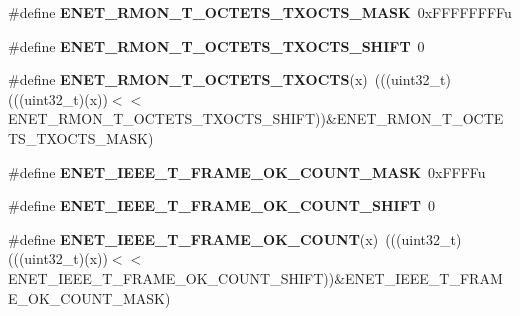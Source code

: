 \begin{DoxyCompactItemize}
\item 
\#define {\bfseries E\+N\+E\+T\+\_\+\+R\+M\+O\+N\+\_\+\+T\+\_\+\+O\+C\+T\+E\+T\+S\+\_\+\+T\+X\+O\+C\+T\+S\+\_\+\+M\+A\+SK}~0x\+F\+F\+F\+F\+F\+F\+F\+Fu\hypertarget{group__ENET__Register__Masks_ga5ad525f27fd78ec68eefefbff4b87b3a}{}\label{group__ENET__Register__Masks_ga5ad525f27fd78ec68eefefbff4b87b3a}

\item 
\#define {\bfseries E\+N\+E\+T\+\_\+\+R\+M\+O\+N\+\_\+\+T\+\_\+\+O\+C\+T\+E\+T\+S\+\_\+\+T\+X\+O\+C\+T\+S\+\_\+\+S\+H\+I\+FT}~0\hypertarget{group__ENET__Register__Masks_gacd37d2d1ea131990ecfbae1a3c933f92}{}\label{group__ENET__Register__Masks_gacd37d2d1ea131990ecfbae1a3c933f92}

\item 
\#define {\bfseries E\+N\+E\+T\+\_\+\+R\+M\+O\+N\+\_\+\+T\+\_\+\+O\+C\+T\+E\+T\+S\+\_\+\+T\+X\+O\+C\+TS}(x)~(((uint32\+\_\+t)(((uint32\+\_\+t)(x))$<$$<$E\+N\+E\+T\+\_\+\+R\+M\+O\+N\+\_\+\+T\+\_\+\+O\+C\+T\+E\+T\+S\+\_\+\+T\+X\+O\+C\+T\+S\+\_\+\+S\+H\+I\+FT))\&E\+N\+E\+T\+\_\+\+R\+M\+O\+N\+\_\+\+T\+\_\+\+O\+C\+T\+E\+T\+S\+\_\+\+T\+X\+O\+C\+T\+S\+\_\+\+M\+A\+SK)\hypertarget{group__ENET__Register__Masks_ga26928891c693eebf6309fdb2e2152615}{}\label{group__ENET__Register__Masks_ga26928891c693eebf6309fdb2e2152615}

\item 
\#define {\bfseries E\+N\+E\+T\+\_\+\+I\+E\+E\+E\+\_\+\+T\+\_\+\+F\+R\+A\+M\+E\+\_\+\+O\+K\+\_\+\+C\+O\+U\+N\+T\+\_\+\+M\+A\+SK}~0x\+F\+F\+F\+Fu\hypertarget{group__ENET__Register__Masks_ga23f952e4fec141cb90d9847d74dd50f0}{}\label{group__ENET__Register__Masks_ga23f952e4fec141cb90d9847d74dd50f0}

\item 
\#define {\bfseries E\+N\+E\+T\+\_\+\+I\+E\+E\+E\+\_\+\+T\+\_\+\+F\+R\+A\+M\+E\+\_\+\+O\+K\+\_\+\+C\+O\+U\+N\+T\+\_\+\+S\+H\+I\+FT}~0\hypertarget{group__ENET__Register__Masks_gab12c920d9e9f6383e5981fb59764e3a9}{}\label{group__ENET__Register__Masks_gab12c920d9e9f6383e5981fb59764e3a9}

\item 
\#define {\bfseries E\+N\+E\+T\+\_\+\+I\+E\+E\+E\+\_\+\+T\+\_\+\+F\+R\+A\+M\+E\+\_\+\+O\+K\+\_\+\+C\+O\+U\+NT}(x)~(((uint32\+\_\+t)(((uint32\+\_\+t)(x))$<$$<$E\+N\+E\+T\+\_\+\+I\+E\+E\+E\+\_\+\+T\+\_\+\+F\+R\+A\+M\+E\+\_\+\+O\+K\+\_\+\+C\+O\+U\+N\+T\+\_\+\+S\+H\+I\+FT))\&E\+N\+E\+T\+\_\+\+I\+E\+E\+E\+\_\+\+T\+\_\+\+F\+R\+A\+M\+E\+\_\+\+O\+K\+\_\+\+C\+O\+U\+N\+T\+\_\+\+M\+A\+SK)\hypertarget{group__ENET__Register__Masks_ga0d9fd1a5ed3e423377b644d61c9ee6a4}{}\label{group__ENET__Register__Masks_ga0d9fd1a5ed3e423377b644d61c9ee6a4}


\end{DoxyCompactItemize}
